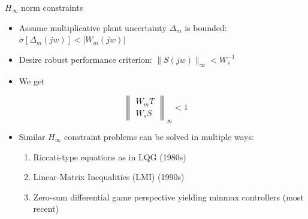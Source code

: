 \documentclass[handout]{beamer}
\begin{document}
\begin{frame}{$H_{\infty}$ norm constraints}
\begin{itemize}
\item Assume multiplicative plant uncertainty $\Delta_m$ is bounded: $\bar{\sigma}[\Delta_m(jw)] < |W_m(jw)|$
\item Desire robust performance criterion: $\|S(jw)\|_{\infty} < W_s^{-1}$
\item We get
\end{itemize}
\begin{equation}
\left\| \begin{array}{c}
W_mT \\
W_sS \end{array} \right\|_{\infty} < 1
\end{equation}
\begin{itemize}
\item Similar $H_{\infty}$ constraint problems can be solved in multiple ways:
\begin{enumerate}
\item Riccati-type equations as in LQG (1980s)
\item Linear-Matrix Inequalities (LMI) (1990s)
\item Zero-sum differential game perspective yielding minmax controllers (most recent)
\end{enumerate}
\end{itemize}
\end{frame}
%
\end{document}
